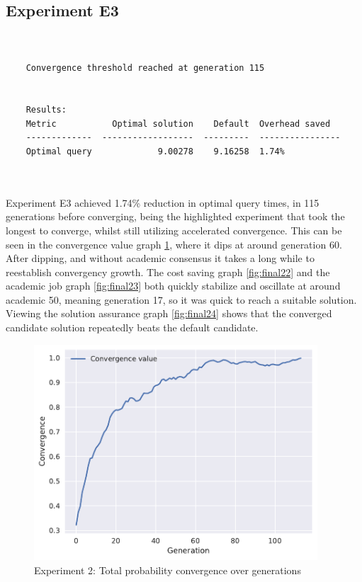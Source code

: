 \documentclass[a4paper,english]{report}
\begin{document}
	\subsection{Experiment E3}
	\begin{verbatim}
	
	
	Convergence threshold reached at generation 115
	
	
	Results:
	Metric           Optimal solution    Default  Overhead saved
	-------------  ------------------  ---------  ----------------
	Optimal query             9.00278    9.16258  1.74%

	
	\end{verbatim}
	Experiment E3 achieved 1.74\% reduction in optimal query times, in 115 generations before converging, being the highlighted experiment that took the longest to converge, whilst still utilizing accelerated convergence. This can be seen in the convergence value graph \ref{fig:final21}, where it dips at around generation 60. After dipping, and without academic consensus it takes a long while to reestablish convergency growth. The cost saving graph \ref{fig:final22} and the academic job graph \ref{fig:final23} both quickly stabilize and oscillate at around academic 50, meaning generation 17, so it was quick to reach a suitable solution. Viewing the solution assurance graph \ref{fig:final24} shows that the converged candidate solution repeatedly beats the default candidate.
	\clearpage
	\begin{figure}[H]
		\centering
		\includegraphics[width=300pt]{runlogs/final7/1}
		\caption{Experiment 2: Total probability convergence over generations}
		\label{fig:final21}
	\end{figure}
\end{document}
